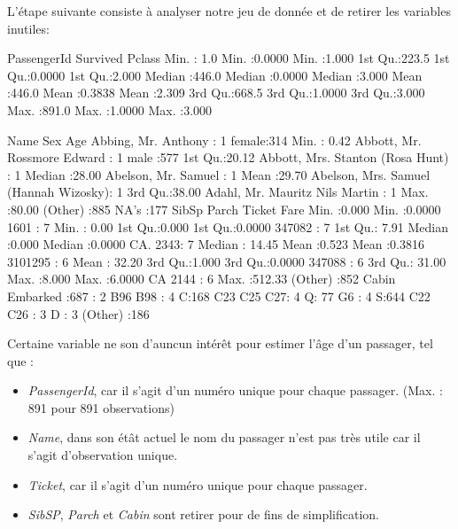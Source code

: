 \documentclass[11pt,french]{report}
\begin{document}
L'étape suivante consiste à analyser notre jeu de donnée et de retirer les variables inutiles:
\begin{Schunk}
\begin{Soutput}
  PassengerId       Survived          Pclass     
 Min.   :  1.0   Min.   :0.0000   Min.   :1.000  
 1st Qu.:223.5   1st Qu.:0.0000   1st Qu.:2.000  
 Median :446.0   Median :0.0000   Median :3.000  
 Mean   :446.0   Mean   :0.3838   Mean   :2.309  
 3rd Qu.:668.5   3rd Qu.:1.0000   3rd Qu.:3.000  
 Max.   :891.0   Max.   :1.0000   Max.   :3.000  
                                                 
                                    Name         Sex           Age       
 Abbing, Mr. Anthony                  :  1   female:314   Min.   : 0.42  
 Abbott, Mr. Rossmore Edward          :  1   male  :577   1st Qu.:20.12  
 Abbott, Mrs. Stanton (Rosa Hunt)     :  1                Median :28.00  
 Abelson, Mr. Samuel                  :  1                Mean   :29.70  
 Abelson, Mrs. Samuel (Hannah Wizosky):  1                3rd Qu.:38.00  
 Adahl, Mr. Mauritz Nils Martin       :  1                Max.   :80.00  
 (Other)                              :885                NA's   :177    
     SibSp           Parch             Ticket         Fare       
 Min.   :0.000   Min.   :0.0000   1601    :  7   Min.   :  0.00  
 1st Qu.:0.000   1st Qu.:0.0000   347082  :  7   1st Qu.:  7.91  
 Median :0.000   Median :0.0000   CA. 2343:  7   Median : 14.45  
 Mean   :0.523   Mean   :0.3816   3101295 :  6   Mean   : 32.20  
 3rd Qu.:1.000   3rd Qu.:0.0000   347088  :  6   3rd Qu.: 31.00  
 Max.   :8.000   Max.   :6.0000   CA 2144 :  6   Max.   :512.33  
                                  (Other) :852                   
         Cabin     Embarked
            :687    :  2   
 B96 B98    :  4   C:168   
 C23 C25 C27:  4   Q: 77   
 G6         :  4   S:644   
 C22 C26    :  3           
 D          :  3           
 (Other)    :186           
\end{Soutput}
\end{Schunk}

\bigskip
Certaine variable ne son d'auncun intérêt pour estimer l'âge d'un passager, tel que :
\begin{itemize}
\item \emph{PassengerId}, car il s'agit d'un numéro unique pour chaque passager. (Max. : 891 pour 891 observations)
\item \emph{Name}, dans son étât actuel le nom du passager n'est pas très utile car il s'agit d'observation unique.
\item \emph{Ticket}, car il s'agit d'un numéro unique pour chaque passager.
\item \emph{SibSP}, \emph{Parch} et \emph{Cabin} sont retirer pour de fins de simplification. 
\end{itemize}
\end{document}
